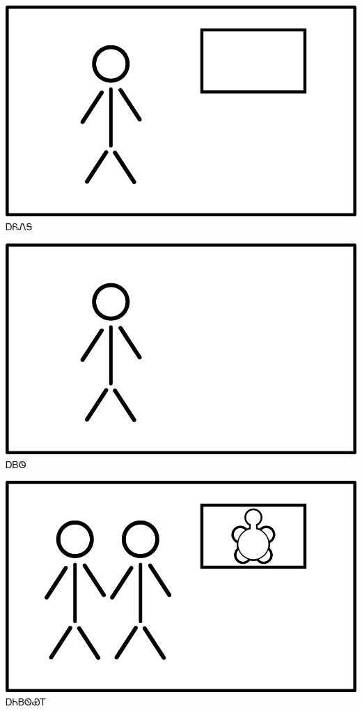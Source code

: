 \documentclass[avery5371]{flashcards}%
\begin{document}
    \begin{flashcard}{
        \includegraphics[width=0.95\columnwidth,height=.51\columnwidth,keepaspectratio]{../artwork/flags/ayonega-flag}
    }
        \Huge ᎠᏲᏁᎦ
    \end{flashcard}

    \begin{flashcard}{
        \includegraphics[width=0.95\columnwidth,height=.51\columnwidth,keepaspectratio]{../artwork/flags/ayvwi-no-flag}
    }
        \Huge ᎠᏴᏫ
    \end{flashcard}


    \begin{flashcard}{
        \includegraphics[width=0.95\columnwidth,height=.51\columnwidth,keepaspectratio]{../artwork/flags/anidaksi-flag}
    }
        \Huge ᎠᏂᏴᏫᏯᎢ
    \end{flashcard}
\end{document}

